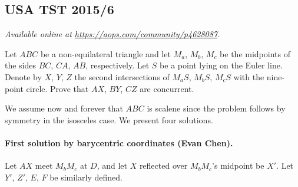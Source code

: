 \documentclass[11pt]{scrartcl}
\begin{document}
\subsection{USA TST 2015/6}
\textsl{Available online at \url{https://aops.com/community/p4628087}.}
\begin{mdframed}[style=mdpurplebox,frametitle={Problem statement}]
Let $ABC$ be a non-equilateral triangle
and let $M_a$, $M_b$, $M_c$ be the midpoints
of the sides $BC$, $CA$, $AB$, respectively.
Let $S$ be a point lying on the Euler line.
Denote by $X$, $Y$, $Z$ the second intersections
of $M_a S$, $M_b S$, $M_c S$ with the nine-point circle.
Prove that $AX$, $BY$, $CZ$ are concurrent.
\end{mdframed}
We assume now and forever that $ABC$ is scalene since the problem
follows by symmetry in the isosceles case.
We present four solutions.

\paragraph{First solution by barycentric coordinates (Evan Chen).}
Let $AX$ meet $M_b M_c$ at $D$,
and let $X$ reflected over $M_b M_c$'s midpoint be $X'$.
Let $Y'$, $Z'$, $E$, $F$ be similarly defined.
\end{document}
